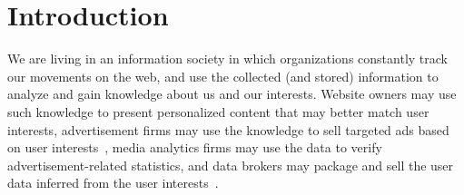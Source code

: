 \documentclass[letterpaper]{sig-alternate-10pt}
\begin{document}




\section{Introduction}

We are living in an information society in which organizations constantly track our movements 
on the web, and use the collected (and stored) information to analyze and gain 
knowledge about us and our interests.  Website owners may use such knowledge to present personalized 
content that may better match user interests, advertisement firms may use the knowledge to sell 
targeted ads based on user interests~\cite{GEC+13,SLB+14,YZL+13,LSW+13}, media analytics firms may use the data to verify 
advertisement-related statistics, and data brokers may package and sell the user data 
inferred from the user interests~\cite{Armo14}.
\end{document}
